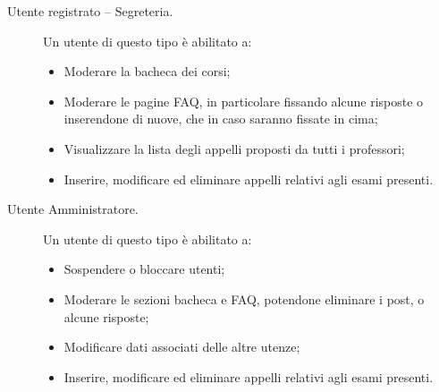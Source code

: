 \documentclass [a4paper,11pt]{book}
\begin{document}
\begin{description}
\item[Utente registrato – Segreteria.] Un utente di questo tipo è abilitato a:

\begin{itemize}
\item Moderare la bacheca dei corsi;
\item Moderare le pagine FAQ, in particolare fissando alcune risposte o inserendone di nuove, che in caso saranno fissate in cima;
\item Visualizzare la lista degli appelli proposti da tutti i professori;
\item Inserire, modificare ed eliminare appelli relativi agli esami presenti.
\end{itemize}

\item[Utente Amministratore.] Un utente di questo tipo è abilitato a:

\begin{itemize}
\item Sospendere o bloccare utenti;
\item Moderare le sezioni bacheca e FAQ, potendone eliminare i post, o alcune risposte;
\item Modificare dati associati delle altre utenze;
\item Inserire, modificare ed eliminare appelli relativi agli esami presenti.
\end{itemize}
\end{description}

\medskip
\medskip
\end{document}
